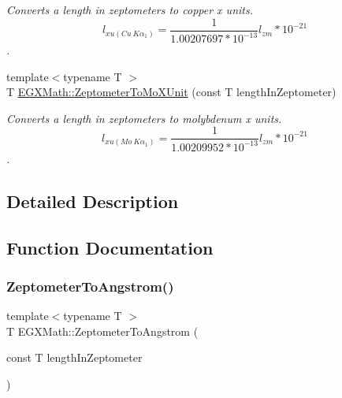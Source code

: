 \begin{DoxyCompactItemize}
\begin{DoxyCompactList}\small\item\em Converts a length in zeptometers to copper x units. \[ l_{xu(Cu\ K\alpha_1)}= \frac{1}{1.00207697*10^{-13}} l_{zm} * 10^{-21}\]. \end{DoxyCompactList}\item 
{\footnotesize template$<$typename T $>$ }\\T \mbox{\hyperlink{group___e_g_x_math-_conversions-_length_conversions-_s_i-_zeptometer-_non-_s_i_gaa621a874847d7e6aae8d04395c68a313}{E\+G\+X\+Math\+::\+Zeptometer\+To\+Mo\+X\+Unit}} (const T length\+In\+Zeptometer)
\begin{DoxyCompactList}\small\item\em Converts a length in zeptometers to molybdenum x units. \[ l_{xu(Mo\ K\alpha_1)}=\frac{1}{1.00209952*10^{-13}} l_{zm} * 10^{-21}\]. \end{DoxyCompactList}\end{DoxyCompactItemize}


\subsection{Detailed Description}


\subsection{Function Documentation}
\mbox{\label{group___e_g_x_math-_conversions-_length_conversions-_s_i-_zeptometer-_non-_s_i_gaa7023afd2a269dddf741cb4299803ef2}} 
\subsubsection{\texorpdfstring{Zeptometer\+To\+Angstrom()}{ZeptometerToAngstrom()}}
{\footnotesize\ttfamily template$<$typename T $>$ \\
T E\+G\+X\+Math\+::\+Zeptometer\+To\+Angstrom (\begin{DoxyParamCaption}\item[{const T}]{length\+In\+Zeptometer }\end{DoxyParamCaption})}



